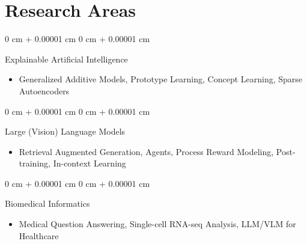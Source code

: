 \documentclass[10pt, letterpaper]{article}
\newenvironment{highlightsforbulletentries}{
    \begin{itemize}[
        topsep=0.10 cm,
        parsep=0.10 cm,
        partopsep=0pt,
        itemsep=0pt,
        leftmargin=10pt
    ]
}{
    \end{itemize}
} %
\newenvironment{onecolentry}{
    \begin{adjustwidth}{
        0 cm + 0.00001 cm
    }{
        0 cm + 0.00001 cm
    }
}{
    \end{adjustwidth}
} %
\begin{document}
    

    \section{Research Areas}
        \begin{onecolentry}
            Explainable Artificial Intelligence
            \begin{highlightsforbulletentries}
            \item Generalized Additive Models, Prototype Learning, Concept Learning, Sparse Autoencoders
            \end{highlightsforbulletentries}
        \end{onecolentry}

        \vspace{0.10 cm}
        \begin{onecolentry}
            Large (Vision) Language Models
            \begin{highlightsforbulletentries}
            \item Retrieval Augmented Generation, Agents, Process Reward Modeling, Post-training, In-context Learning
            \end{highlightsforbulletentries}
        \end{onecolentry}

        \vspace{0.10 cm}
        \begin{onecolentry}
            Biomedical Informatics
            \begin{highlightsforbulletentries}
            \item Medical Question Answering, Single-cell RNA-seq Analysis,  LLM/VLM for Healthcare
            \end{highlightsforbulletentries}
        \end{onecolentry}
        
\end{document}
